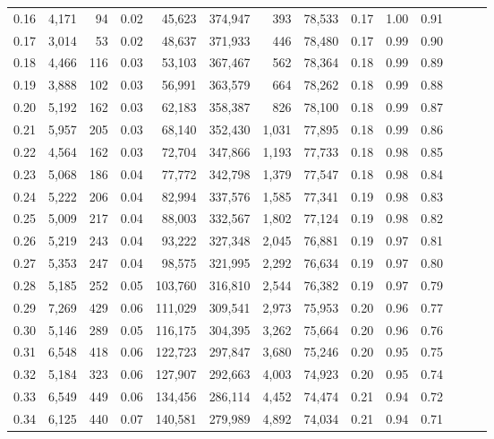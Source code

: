 \begin{tabular}{rrrrrrrrrrrrrr}
0.16 &  4,171 &     94 &  0.02 &   45,623 &  374,947 &     393 &  78,533 &  0.17 &  1.00 &      0.91 \\
0.17 &  3,014 &     53 &  0.02 &   48,637 &  371,933 &     446 &  78,480 &  0.17 &  0.99 &      0.90 \\
0.18 &  4,466 &    116 &  0.03 &   53,103 &  367,467 &     562 &  78,364 &  0.18 &  0.99 &      0.89 \\
0.19 &  3,888 &    102 &  0.03 &   56,991 &  363,579 &     664 &  78,262 &  0.18 &  0.99 &      0.88 \\
0.20 &  5,192 &    162 &  0.03 &   62,183 &  358,387 &     826 &  78,100 &  0.18 &  0.99 &      0.87 \\
0.21 &  5,957 &    205 &  0.03 &   68,140 &  352,430 &   1,031 &  77,895 &  0.18 &  0.99 &      0.86 \\
0.22 &  4,564 &    162 &  0.03 &   72,704 &  347,866 &   1,193 &  77,733 &  0.18 &  0.98 &      0.85 \\
0.23 &  5,068 &    186 &  0.04 &   77,772 &  342,798 &   1,379 &  77,547 &  0.18 &  0.98 &      0.84 \\
0.24 &  5,222 &    206 &  0.04 &   82,994 &  337,576 &   1,585 &  77,341 &  0.19 &  0.98 &      0.83 \\
0.25 &  5,009 &    217 &  0.04 &   88,003 &  332,567 &   1,802 &  77,124 &  0.19 &  0.98 &      0.82 \\
0.26 &  5,219 &    243 &  0.04 &   93,222 &  327,348 &   2,045 &  76,881 &  0.19 &  0.97 &      0.81 \\
0.27 &  5,353 &    247 &  0.04 &   98,575 &  321,995 &   2,292 &  76,634 &  0.19 &  0.97 &      0.80 \\
0.28 &  5,185 &    252 &  0.05 &  103,760 &  316,810 &   2,544 &  76,382 &  0.19 &  0.97 &      0.79 \\
0.29 &  7,269 &    429 &  0.06 &  111,029 &  309,541 &   2,973 &  75,953 &  0.20 &  0.96 &      0.77 \\
0.30 &  5,146 &    289 &  0.05 &  116,175 &  304,395 &   3,262 &  75,664 &  0.20 &  0.96 &      0.76 \\
0.31 &  6,548 &    418 &  0.06 &  122,723 &  297,847 &   3,680 &  75,246 &  0.20 &  0.95 &      0.75 \\
0.32 &  5,184 &    323 &  0.06 &  127,907 &  292,663 &   4,003 &  74,923 &  0.20 &  0.95 &      0.74 \\
0.33 &  6,549 &    449 &  0.06 &  134,456 &  286,114 &   4,452 &  74,474 &  0.21 &  0.94 &      0.72 \\
0.34 &  6,125 &    440 &  0.07 &  140,581 &  279,989 &   4,892 &  74,034 &  0.21 &  0.94 &      0.71 \\

\end{tabular}
